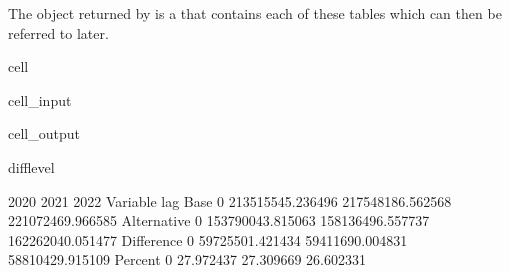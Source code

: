 \documentclass[letterpaper,10pt,english]{jupyterBook}
\begin{document}
\sphinxAtStartPar
The object returned by  is a  that contains each of these tables which can then be referred to later.

\begin{sphinxuseclass}{cell}\begin{sphinxVerbatimInput}

\begin{sphinxuseclass}{cell_input}
\begin{sphinxVerbatim}[commandchars=\\\{\}]

   
    
\end{sphinxVerbatim}

\end{sphinxuseclass}\end{sphinxVerbatimInput}
\begin{sphinxVerbatimOutput}

\begin{sphinxuseclass}{cell_output}
\begin{sphinxVerbatim}[commandchars=\\\{\}]
\PYGZsq{}diff\PYGZus{}level\PYGZsq{}
\end{sphinxVerbatim}

\begin{sphinxVerbatim}[commandchars=\\\{\}]
                             2020              2021              2022   
Variable    lag                                                         
Base        0    213515545.236496  217548186.562568  221072469.966585  \PYGZbs{}
Alternative 0    153790043.815063  158136496.557737  162262040.051477   
Difference  0    \PYGZhy{}59725501.421434  \PYGZhy{}59411690.004831  \PYGZhy{}58810429.915109   
Percent     0          \PYGZhy{}27.972437        \PYGZhy{}27.309669        \PYGZhy{}26.602331   


\end{sphinxVerbatim}
\end{sphinxuseclass}
\end{sphinxVerbatimOutput}
\end{sphinxuseclass}
\end{document}
